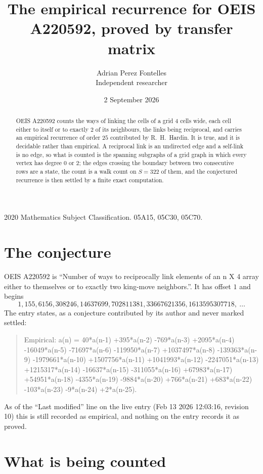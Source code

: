 \documentclass[11pt,a4paper]{article}
\title{The empirical recurrence for OEIS A220592, proved by transfer matrix}
\author{Adrian Perez Fontelles\\ \small Independent researcher}
\date{2 September 2026}
\theoremstyle{plain}
\theoremstyle{definition}
\begin{document}
\maketitle

\begin{abstract}
OEIS A220592 counts the ways of linking the cells of a grid $4$ cells wide, each cell either to
itself or to exactly $2$ of its neighbours, the links being reciprocal, and carries an
empirical recurrence of order $25$ contributed by R.~H.~Hardin. It is true, and it is
decidable rather than empirical. A reciprocal link is an undirected edge and a self-link is
no edge, so what is counted is the spanning subgraphs of a grid graph in which every vertex
has degree $0$ or $2$; the edges crossing the boundary between two consecutive rows are a
state, the count is a walk count on $S=322$ of them, and the conjectured recurrence is then
settled by a finite exact computation.
\end{abstract}

\noindent\small 2020 Mathematics Subject Classification. 05A15, 05C30, 05C70.\normalsize

\section{The conjecture}

OEIS A220592 is ``Number of ways to reciprocally link elements of an n X 4 array either to themselves or to exactly two king-move neighbors.''. It has offset $1$ and begins
\[
1, 155, 6156, 308246, 14637699, 702811381, 33667621356, 1613595307718,\ \dots
\]
The entry states, as a conjecture contributed by its author and never marked settled:
\begin{quote}
Empirical: a(n) = 40*a(n-1) +395*a(n-2) -769*a(n-3) +2095*a(n-4) -16049*a(n-5) -71697*a(n-6) -119950*a(n-7) +1037497*a(n-8) -139363*a(n-9) -1979661*a(n-10) +1507756*a(n-11) +1041993*a(n-12) -2247051*a(n-13) +1215317*a(n-14) -16637*a(n-15) -311055*a(n-16) +67983*a(n-17) +54951*a(n-18) -4355*a(n-19) -9884*a(n-20) +766*a(n-21) +683*a(n-22) -103*a(n-23) -9*a(n-24) +2*a(n-25).
\end{quote}
As of the ``Last modified'' line on the live entry (Feb 13 2026 12:03:16, revision 10) this is still
recorded as empirical, and nothing on the entry records it as proved.

\section{What is being counted}
\end{document}
